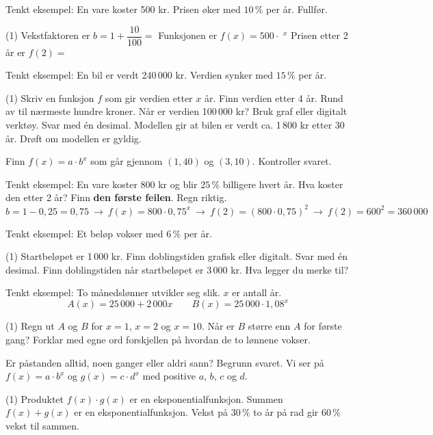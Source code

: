 Tenkt eksempel: En vare koster 500 kr. Prisen øker med $10\,\%$ per år. Fullfør.
\begin{tasks}(1)
  \task Vekstfaktoren er $b = 1 + \dfrac{10}{100} = $ \skrivlinje[2cm]
  \task Funksjonen er $f(x) = 500 \cdot$ \skrivlinje[2cm]$^x$
  \task Prisen etter 2 år er $f(2) = $ \skrivlinje[2cm]
\end{tasks}


Tenkt eksempel: En bil er verdt 240\,000 kr. Verdien synker med $15\,\%$ per år.
\begin{tasks}(1)
  \task Skriv en funksjon $f$ som gir verdien etter $x$ år.
  \task Finn verdien etter 4 år. Rund av til nærmeste hundre kroner.
  \task Når er verdien 100\,000 kr? Bruk graf eller digitalt verktøy. Svar med én desimal.
  \task Modellen gir at bilen er verdt ca. 1\,800 kr etter 30 år. Drøft om modellen er gyldig.
\end{tasks}

Finn $f(x) = a \cdot b^x$ som går gjennom $(1, 40)$ og $(3, 10)$. Kontroller svaret.

Tenkt eksempel: En vare koster 800 kr og blir $25\,\%$ billigere hvert år. Hva koster den etter 2 år?
Finn \textbf{den første feilen}. Regn riktig.
\[ b = 1 - 0{,}25 = 0{,}75 \ \longrightarrow\ f(x) = 800 \cdot 0{,}75^x \ \longrightarrow\ f(2) = (800 \cdot 0{,}75)^2 \ \longrightarrow\ f(2) = 600^2 = 360\,000 \]

Tenkt eksempel: Et beløp vokser med $6\,\%$ per år.
\begin{tasks}(1)
  \task Startbeløpet er 1\,000 kr. Finn doblingstiden grafisk eller digitalt. Svar med én desimal.
  \task Finn doblingstiden når startbeløpet er 3\,000 kr. Hva legger du merke til?
\end{tasks}

Tenkt eksempel: To månedslønner utvikler seg slik. $x$ er antall år.
\[ A(x) = 25\,000 + 2\,000x \qquad B(x) = 25\,000 \cdot 1{,}08^x \]
\begin{tasks}(1)
  \task Regn ut $A$ og $B$ for $x = 1$, $x = 2$ og $x = 10$.
  \task Når er $B$ større enn $A$ for første gang?
  \task Forklar med egne ord forskjellen på hvordan de to lønnene vokser.
\end{tasks}


Er påstanden alltid, noen ganger eller aldri sann? Begrunn svaret.
Vi ser på $f(x) = a \cdot b^x$ og $g(x) = c \cdot d^x$ med positive $a$, $b$, $c$ og $d$.
\begin{tasks}(1)
  \task Produktet $f(x) \cdot g(x)$ er en eksponentialfunksjon.
  \task Summen $f(x) + g(x)$ er en eksponentialfunksjon.
  \task Vekst på $30\,\%$ to år på rad gir $60\,\%$ vekst til sammen.
\end{tasks}

